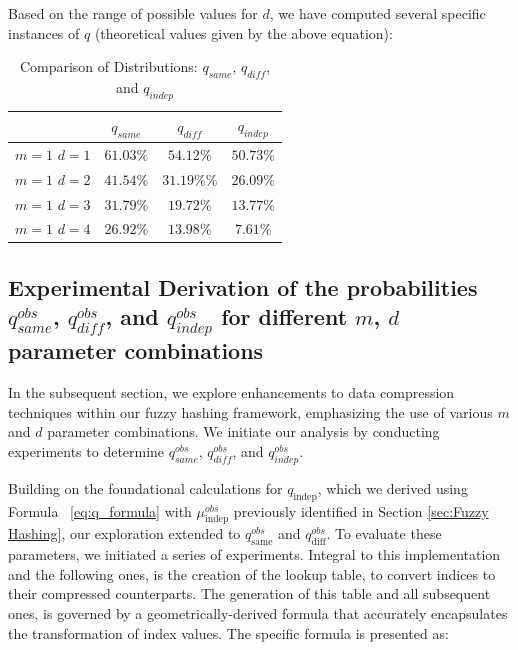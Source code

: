 Based on the range of possible values for \(d\), we have computed several specific instances of \(q\) (theoretical values given by the above equation):
\begin{table}[H]
    \centering
    \renewcommand{\arraystretch}{1.25}\begin{tabular}{|c|c|c|c|}
        \hline
        & $q_{same}$ & $q_{diff}$ & $q_{indep}$\\
        \hline
        \(m = 1\) \(d = 1\) & $61.03\%$ & $54.12\%$ & $50.73\%$\\
        \(m = 1\) \(d = 2\) & $41.54\%$ & $31.19\%\%$ & $26.09\%$\\
        \(m = 1\) \(d = 3\) & $31.79\%$ & $19.72\%$ & $13.77\%$\\
        \(m = 1\) \(d = 4\) & $26.92\%$ & $13.98\%$ & $7.61\%$\\
        \hline
    \end{tabular}
\caption{Comparison of Distributions: $q_{same}$, $q_{diff}$, and $q_{indep}$}
\end{table}

\subsection{Experimental Derivation of the probabilities $q_{same}^{obs}$, $q_{diff}^{obs}$, and $q_{indep}^{obs}$ for different \(m\), \(d\) parameter combinations}

In the subsequent section, we explore enhancements to data compression techniques within our fuzzy hashing framework, emphasizing the use of various \(m\) and \(d\) parameter combinations. We initiate our analysis by conducting experiments to determine \(q_{same}^{obs}\), \(q_{diff}^{obs}\), and \(q_{indep}^{obs}\).

Building on the foundational calculations for \(q_{\text{indep}}\), which we derived using Formula ~\ref{eq:q_formula} with \( \mu^{obs}_{\text{indep}} \) previously identified in Section \ref{sec:Fuzzy Hashing}, our exploration extended to \(q^{obs}_{\text{same}}\) and \(q^{obs}_\text{diff}\). To evaluate these parameters, we initiated a series of experiments. Integral to this implementation and the following ones, is the creation of the lookup table, to convert indices to their compressed counterparts. The generation of this table and all subsequent ones, is governed by a geometrically-derived formula that accurately encapsulates the transformation of index values. The specific formula is presented as:

